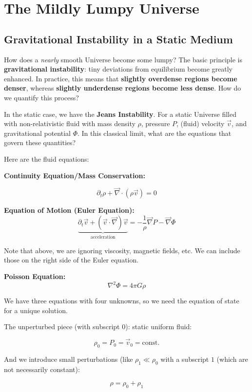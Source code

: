 \documentclass{article}
\newcommand{\be}{\begin{equation}}
\newcommand{\ee}{\end{equation}}
\begin{document}
\section{The Mildly Lumpy Universe}

\subsection{Gravitational Instability in a Static Medium}

How does a \textit{nearly} smooth Universe become some lumpy? The basic principle is \textbf{gravitational instability}: tiny deviations from equilibrium become greatly enhanced. In practice, this means that \textbf{slightly overdense regions become denser}, whereas \textbf{slightly underdense regions become less dense}. How do we quantify this process? 

In the static case, we have the \textbf{Jeans Instability}. For a static Universe filled with non-relativistic fluid with mass density $\rho$, pressure $P$, (fluid) velocity $\vec{v}$, and gravitational potential $\Phi$. In this classical limit, what are the equations that govern these quantities?

Here are the fluid equations:

\noindent\textbf{Continuity Equation/Mass Conservation:}

\be
\partial_t \rho + \vec{\nabla} \cdot (\rho \vec{v}) = 0
\ee

\noindent\textbf{Equation of Motion (Euler Equation):}
\be
\underbrace{\partial_t \vec{v} + \left(\vec{v} \cdot \vec{\nabla}\right)\vec{v}}_\text{acceleration} = -\frac{1}{\rho}\vec{\nabla}P - \vec{\nabla} \Phi
\ee

Note that above, we are ignoring viscosity, magnetic fields, etc. We can include those on the right side of the Euler equation. 

\noindent\textbf{Poisson Equation:}
\be
\nabla^2 \Phi = 4\pi G \rho
\ee

We have three equations with four unknowns, so we need the equation of state for a unique solution. 

The unperturbed piece (with subscript $0$): static uniform fluid:

\be
\rho_0 = P_0 = \vec{v}_0 = \text{const.}
\ee

And we introduce small perturbations (like $\rho_1 \ll \rho_0$ with a subscript $1$ (which are not necessarily constant):

\be
\rho = \rho_0 + \rho_1
\ee
\end{document}
